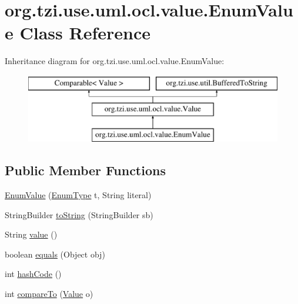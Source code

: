 \hypertarget{classorg_1_1tzi_1_1use_1_1uml_1_1ocl_1_1value_1_1_enum_value}{\section{org.\-tzi.\-use.\-uml.\-ocl.\-value.\-Enum\-Value Class Reference}
\label{classorg_1_1tzi_1_1use_1_1uml_1_1ocl_1_1value_1_1_enum_value}
}
Inheritance diagram for org.\-tzi.\-use.\-uml.\-ocl.\-value.\-Enum\-Value\-:\begin{figure}[H]
\begin{center}
\leavevmode
\includegraphics[height=3.000000cm]{classorg_1_1tzi_1_1use_1_1uml_1_1ocl_1_1value_1_1_enum_value}
\end{center}
\end{figure}
\subsection*{Public Member Functions}
\begin{DoxyCompactItemize}
\item 
\hyperlink{classorg_1_1tzi_1_1use_1_1uml_1_1ocl_1_1value_1_1_enum_value_a0d53e7f7254546c7bce49c7c6bcf2ae2}{Enum\-Value} (\hyperlink{classorg_1_1tzi_1_1use_1_1uml_1_1ocl_1_1type_1_1_enum_type}{Enum\-Type} t, String literal)
\item 
String\-Builder \hyperlink{classorg_1_1tzi_1_1use_1_1uml_1_1ocl_1_1value_1_1_enum_value_a9121d9d1c80ee64f9273d1bda28a3eb9}{to\-String} (String\-Builder sb)
\item 
String \hyperlink{classorg_1_1tzi_1_1use_1_1uml_1_1ocl_1_1value_1_1_enum_value_a41bb9783d1007ce915ebfb24fe97ad91}{value} ()
\item 
boolean \hyperlink{classorg_1_1tzi_1_1use_1_1uml_1_1ocl_1_1value_1_1_enum_value_ace3f0c377837c323378ff6b1af0016ba}{equals} (Object obj)
\item 
int \hyperlink{classorg_1_1tzi_1_1use_1_1uml_1_1ocl_1_1value_1_1_enum_value_ac7a817781a254c87c99cca5b36b114ba}{hash\-Code} ()
\item 
int \hyperlink{classorg_1_1tzi_1_1use_1_1uml_1_1ocl_1_1value_1_1_enum_value_a1ccd3ea6f50ef747e5adfdb987139eb6}{compare\-To} (\hyperlink{classorg_1_1tzi_1_1use_1_1uml_1_1ocl_1_1value_1_1_value}{Value} o)
\end{DoxyCompactItemize}
